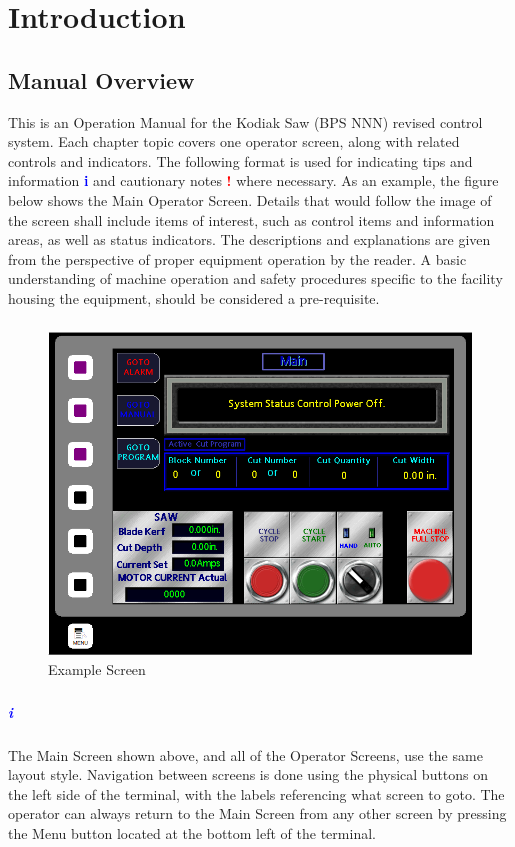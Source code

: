 \chapter{Introduction}

\section{Manual Overview}

This is an Operation Manual for the Kodiak Saw (BPS NNN) revised control system. Each chapter topic covers one operator screen, along with related controls and indicators. The following format is used for indicating tips and information \textbf{\LARGE\textcolor{blue}{i}} and cautionary notes  \textbf{{\LARGE\textcolor{red}{!}}} where necessary. As an example, the figure below shows the Main Operator Screen. Details that would follow the image of the screen shall include items of interest, such as control items and information areas, as well as status indicators. The descriptions and explanations are given from the perspective of proper equipment operation by the reader. A basic understanding of machine operation and safety procedures specific to the facility housing the equipment, should be considered a pre-requisite.
\paragraph{}
\begin{figure}
		\centering
		\includegraphics[width=0.5\linewidth]{screen-captures/main-screen}
		\caption{Example Screen}
		\label{fig:example-screen}
\end{figure}
\paragraph{}
\paragraph*{\textbf{\LARGE \textcolor{blue}{i}}}The Main Screen shown above, and all of the Operator Screens, use the same layout style. Navigation between screens is done using the physical buttons on the left side of the terminal, with the labels referencing what screen to goto. The operator can always return to the Main Screen from any other screen by pressing the Menu button located at the bottom left of the terminal.

